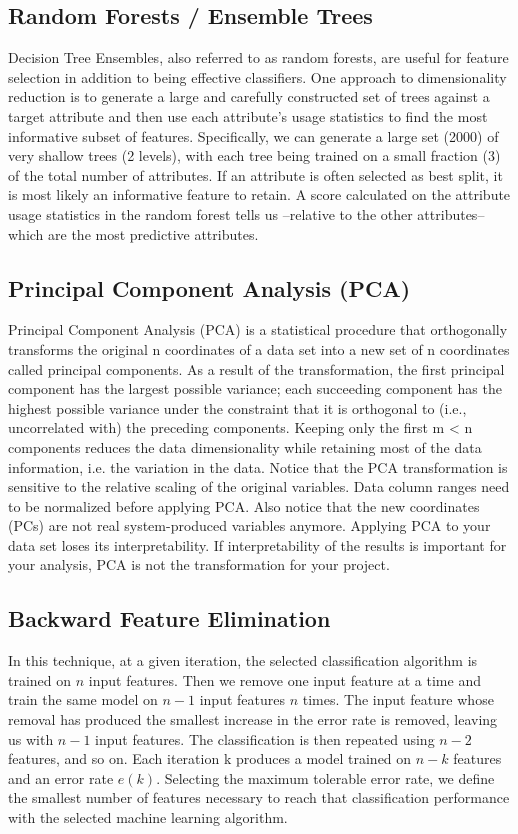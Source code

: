 \documentclass[10pt,a4paper]{article}
\begin{document}
\subsection*{Random Forests / Ensemble Trees}
Decision Tree Ensembles, also referred to as random forests, are useful for
feature selection in addition to being effective classifiers.  One approach to dimensionality reduction is to generate a large and carefully constructed set of trees against a target attribute and then use each attribute’s usage statistics to find the most informative subset of features.  Specifically, we can generate a large set (2000) of very shallow trees (2 levels), with each tree being trained on a small fraction (3) of the total number of attributes. If an attribute is often selected as best split, it is most likely an informative feature to retain. A score calculated on the attribute usage statistics in the random forest tells us --relative to the other attributes-- which are the most predictive attributes.

\subsection*{Principal Component Analysis (PCA)}
Principal Component Analysis (PCA) is a statistical procedure that orthogonally transforms the original n coordinates of a data set into a new set of n coordinates called principal components. As a result of the transformation, the first principal component has the largest possible variance; each succeeding component has the highest possible variance under the constraint that it is orthogonal to (i.e., uncorrelated with) the preceding components. Keeping only the first m < n components reduces the data dimensionality while retaining most of the data information, i.e. the variation in the data. Notice that the PCA transformation is sensitive to the relative scaling of the original variables. Data column ranges need to be normalized before applying PCA. Also notice that the new coordinates (PCs) are not real system-produced variables anymore. Applying PCA to your data set loses its interpretability. If interpretability of the results is important for your analysis, PCA is not the transformation for your project.

\subsection*{Backward Feature Elimination}
In this technique, at a given iteration, the selected classification algorithm is trained on $n$ input features. Then we remove one input feature at a time and train the same model on $n-1$ input features $n$ times. The input feature whose removal has produced the smallest increase in the error rate is removed, leaving us with $n-1$ input features. The classification is then repeated using $n-2$ features, and so on. Each iteration k produces a model trained on $n-k$ features and an error rate $e(k)$. Selecting the maximum tolerable error rate, we define the smallest number of features necessary to reach that classification performance with the selected machine learning algorithm.
\end{document}
